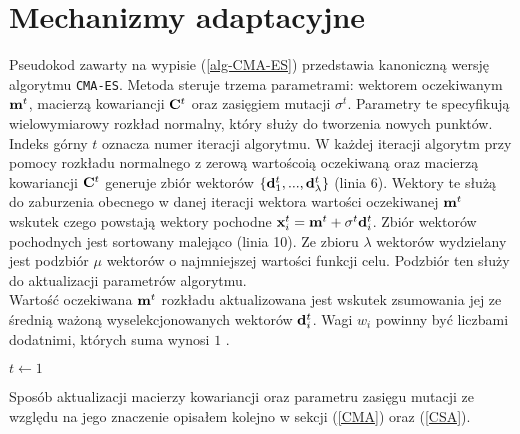 \section{Mechanizmy adaptacyjne}
Pseudokod zawarty na wypisie (\ref{alg-CMA-ES}) przedstawia kanoniczną wersję algorytmu \texttt{CMA-ES}. Metoda steruje trzema parametrami: wektorem oczekiwanym ${\bf m}^{t}$, macierzą kowariancji
${\bf C}^t$ oraz zasięgiem mutacji $\sigma^t$. Parametry te specyfikują wielowymiarowy rozkład normalny, który służy do tworzenia nowych punktów. Indeks górny $t$ oznacza numer iteracji algorytmu.
W każdej iteracji algorytm przy pomocy rozkładu normalnego z zerową wartoścoią oczekiwaną oraz macierzą kowariancji ${\bf C}^t$ generuje zbiór wektorów $\{{\bf d}_1^t,...,{\bf d}_\lambda^t\}$ (linia 6). 
Wektory te służą do zaburzenia obecnego w danej iteracji wektora wartości oczekiwanej ${\bf m}^t$ wskutek czego powstają wektory pochodne ${\bf x}^t_i={\bf m}^t+\sigma^t {\bf d}_i^t$.
Zbiór wektorów pochodnych jest sortowany malejąco (linia 10). Ze zbioru $\lambda$ wektorów wydzielany jest podzbiór $\mu$ wektorów o najmniejszej wartości funkcji celu. Podzbiór ten służy do
aktualizacji parametrów algorytmu. \\
Wartość oczekiwana ${\bf m}^t$ rozkładu aktualizowana jest wskutek zsumowania jej ze średnią ważoną wyselekcjonowanych wektorów ${\bf d}_{i}^{t}$. Wagi $w_{i}$ powinny być liczbami dodatnimi, których suma wynosi $1$ \cite{HansenOstermeier01}.

\begin{algorithm}
  \renewcommand{\thealgorithm}{}
  \begin{algorithmic}[1]
  \State $t \gets 1$
\end{algorithmic}
\end{algorithm}
Sposób aktualizacji macierzy kowariancji oraz parametru zasięgu mutacji ze względu na jego znaczenie opisałem kolejno w sekcji (\ref{CMA}) oraz (\ref{CSA}).
